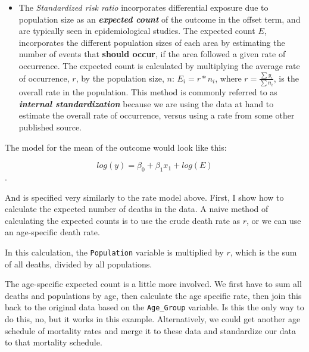 \documentclass[
  letterpaper,
  DIV=11,
  numbers=noendperiod]{scrreprt}
\newenvironment{Shaded}{\begin{snugshade}}{\end{snugshade}}
\newcommand{\CommentTok}[1]{\textcolor[rgb]{0.37,0.37,0.37}{#1}}
\newcommand{\FunctionTok}[1]{\textcolor[rgb]{0.28,0.35,0.67}{#1}}
\newcommand{\NormalTok}[1]{\textcolor[rgb]{0.00,0.23,0.31}{#1}}
\newcommand{\OtherTok}[1]{\textcolor[rgb]{0.00,0.23,0.31}{#1}}
\newcommand{\SpecialCharTok}[1]{\textcolor[rgb]{0.37,0.37,0.37}{#1}}
\providecommand{\tightlist}{%
  \setlength{\itemsep}{0pt}\setlength{\parskip}{0pt}}\usepackage{longtable,booktabs,array}
\begin{document}
\begin{itemize}
\tightlist
\item
  The \emph{Standardized risk ratio} incorporates differential exposure
  due to population size as an \textbf{\emph{expected count}} of the
  outcome in the offset term, and are typically seen in epidemiological
  studies. The expected count \(E\), incorporates the different
  population sizes of each area by estimating the number of events that
  \textbf{should occur}, if the area followed a given rate of
  occurrence. The expected count is calculated by multiplying the
  average rate of occurrence, \(r\), by the population size, \(n\):
  \(E_i = r * n_i\), where \(r = \frac{\sum y_i}{\sum n_i}\), is the
  overall rate in the population. This method is commonly referred to as
  \textbf{\emph{internal standardization}} because we are using the data
  at hand to estimate the overall rate of occurrence, versus using a
  rate from some other published source.
\end{itemize}

The model for the mean of the outcome would look like this:

\[log(y)= \beta_0 + \beta_1 x_1  + log(E)\].

And is specified very similarly to the rate model above. First, I show
how to calculate the expected number of deaths in the data. A naive
method of calculating the expected counts is to use the crude death rate
as \(r\), or we can use an age-specific death rate.

\begin{Shaded}
\end{Shaded}

In this calculation, the \texttt{Population} variable is multiplied by
\(r\), which is the sum of all deaths, divided by all populations.

The age-specific expected count is a little more involved. We first have
to sum all deaths and populations by age, then calculate the age
specific rate, then join this back to the original data based on the
\texttt{Age\_Group} variable. Is this the only way to do this, no, but
it works in this example. Alternatively, we could get another age
schedule of mortality rates and merge it to these data and standardize
our data to that mortality schedule.
\end{document}
